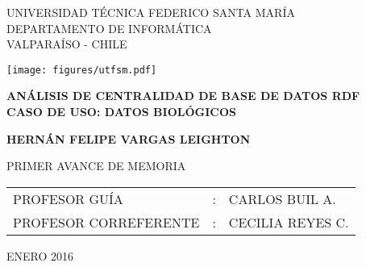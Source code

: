 
\begin{center}
  \begin{spacing}{1}
    {\large UNIVERSIDAD TÉCNICA FEDERICO SANTA MARÍA}\\
    DEPARTAMENTO DE INFORMÁTICA\\
    VALPARAÍSO - CHILE
  \end{spacing}

  \vspace{12mm}
  \texttt{[image: figures/utfsm.pdf]}
  \vspace{15mm}

  \begin{spacing}{1.5} 
    \textbf{\large ANÁLISIS DE CENTRALIDAD DE BASE DE DATOS RDF }\\
    \textbf{\large CASO DE USO: DATOS BIOLÓGICOS }\\
  \end{spacing}

  \vspace{20mm}
  \textbf{\large HERNÁN FELIPE VARGAS LEIGHTON}
  \vspace{12mm}

  \begin{spacing}{1.25} 
    PRIMER AVANCE DE MEMORIA
  \end{spacing}

  \vspace{15mm}
  \begin{table}[h]
    \begin{center}
      \begin{tabular}{ l c l }
        PROFESOR GUÍA & : & CARLOS BUIL A.\\
        PROFESOR CORREFERENTE & : & CECILIA REYES C.\\
      \end{tabular}
    \end{center}
  \end{table}

  \vfill
  \large ENERO 2016
\end{center}
